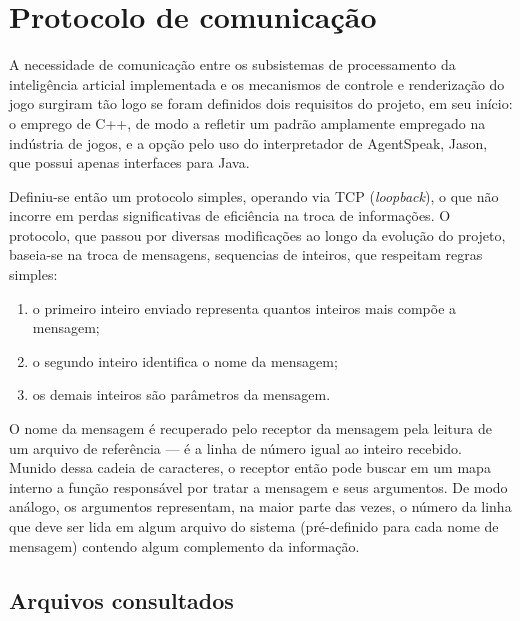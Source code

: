 \section{Protocolo de comunicação}

A necessidade de comunicação entre os subsistemas de processamento da inteligência articial implementada e os mecanismos de controle e renderização do jogo surgiram tão logo se foram definidos dois requisitos do projeto, em seu início: o emprego de C++, de modo a refletir um padrão amplamente empregado na indústria de jogos, e a opção pelo uso do interpretador de AgentSpeak, Jason, que possui apenas interfaces para Java.

Definiu-se então um protocolo simples, operando via TCP (\emph{loopback}), o que não incorre em perdas significativas de eficiência na troca de informações. O protocolo, que passou por diversas modificações ao longo da evolução do projeto, baseia-se na troca de mensagens, sequencias de inteiros, que respeitam regras simples:
\begin{enumerate}
\item o primeiro inteiro enviado representa quantos inteiros mais compõe a mensagem;
\item o segundo inteiro identifica o nome da mensagem;
\item os demais inteiros são parâmetros da mensagem.
\end{enumerate}

O nome da mensagem é recuperado pelo receptor da mensagem pela leitura de um arquivo de referência --- é a linha de número igual ao inteiro recebido. Munido dessa cadeia de caracteres, o receptor então pode buscar em um mapa interno a função responsável por tratar a mensagem e seus argumentos. De modo análogo, os argumentos representam, na maior parte das vezes, o número da linha que deve ser lida em algum arquivo do sistema (pré-definido para cada nome de mensagem) contendo algum complemento da informação.

\subsection{Arquivos consultados}

